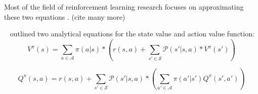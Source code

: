 \documentclass{../main.tex}{}
\begin{document}
Most of the field of reinforcement learning research focuses on approximating these two equations \citep{Tamar2017} \citep{Watkins1992} \citep{Mnih2013}. (cite many more)

~\cite{Bellman1957} outlined two analytical equations for the state value and action value function:
\begin{equation}\label{equation:bellman:state-value-function}
V^{\pi}(s) = \sum_{a \in \mathcal{A}} \pi(a | s) * (r(s, a) + \sum_{s' \in \mathcal{S}} \mathcal{P}(s' | s, a) * V^{\pi}(s'))
\end{equation}

\begin{equation}\label{equation:bellman:action-value-function}
Q^{\pi}(s, a) = r(s, a) + \sum_{s' \in \mathcal{S}} \mathcal{P}(s' | s, a) * (\sum_{a' \in \mathcal{A}} \pi(a' | s') Q^{\pi}(s', a'))
\end{equation}

\end{document}
